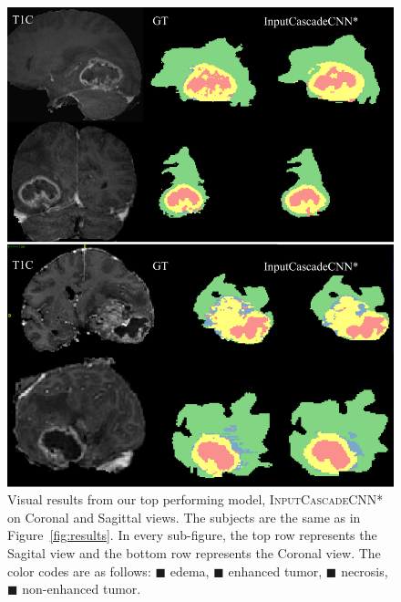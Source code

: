 \documentclass[final,5p,times,twocolumn]{elsarticle}
\newcommand{\MH}[1]{\textcolor{purple}{\small{}[\textbf{Mohammad:} #1]}}
\begin{document}
{


\begin{figure}[tp]

\centering

\includegraphics[width=0.8\linewidth]{Results_multiple_views.pdf}

\caption{Visual results from our top performing model, \textsc{InputCascadeCNN*} on Coronal and Sagittal views. The subjects are the same as in Figure~\ref{fig:results}. In every sub-figure, the top row represents the Sagital view and the bottom row represents the Coronal view. The color codes are as follows:  \textcolor[RGB]{135,213,120}{$\blacksquare$} edema, \textcolor[RGB]{225,225,95}{$\blacksquare$} enhanced tumor,
\textcolor[RGB]{246,145,139}{$\blacksquare$} necrosis,
\textcolor[RGB]{124,167,208}{$\blacksquare$} non-enhanced tumor.}
\label{fig:multiple_views}
\end{figure}




}
\end{document}
